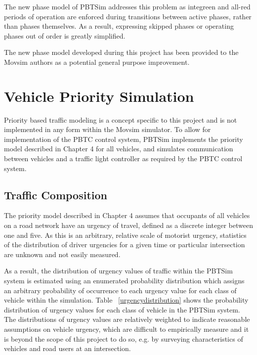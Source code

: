 The new phase model of PBTSim addresses this problem as integreen and all-red periods of operation are enforced during transitions between active phases, rather than phases themselves. As a result, expressing skipped phases or operating phases out of order is greatly simplified. 

The new phase model developed during this project has been provided to the Movsim authors as a potential general purpose improvement.


\section{Vehicle Priority Simulation}

Priority based traffic modeling is a concept specific to this project and is not implemented in any form within the Movsim simulator. To allow for implementation of the PBTC control system, PBTSim implements the priority model described in Chapter 4 for all vehicles, and simulates communication between vehicles and a traffic light controller as required by the PBTC control system.

\subsection{Traffic Composition}

The priority model described in Chapter 4 assumes that occupants of all vehicles on a road network have an urgency of travel, defined as a discrete integer between one and five. As this is an arbitrary, relative scale of motorist urgency, statistics of the distribution of driver urgencies for a given time or particular intersection are unknown and not easily measured.

As a result, the distribution of urgency values of traffic within the PBTSim system is estimated using an enumerated probability distribution which assigns an arbitrary probability of occurrence to each urgency value for each class of vehicle within the simulation. Table ~\ref{urgencydistribution} shows the probability distribution of urgency values for each class of vehicle in the PBTSim system. The distributions of urgency values are relatively weighted to indicate reasonable assumptions on vehicle urgency, which are difficult to empirically measure and it is beyond the scope of this project to do so, e.g. by surveying characteristics of vehicles and road users at an intersection. 

